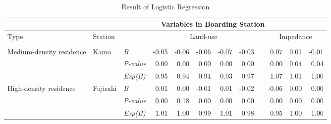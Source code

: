 \begin{sidewaystable}[htbp]
	\centering
	\caption{Result of Logistic Regression}
	\label{tab:chp5:Result}
	\footnotesize %
	\renewcommand{\arraystretch}{1.25} %
	
	\begin{tabular}{p{7em}p{5em}p{5em}<{\centering}rrrrrrrrr}
		\Xhline{1.5pt}
		
		\multicolumn{2}{c}{Destination Station} & & \multicolumn{9}{c}{Variables in Boarding Station} \\
		\midrule
		
		\multirow{2}[5]{7em}{Type} & \multirow{2}[5]{5em}{Station} & \multirow{2}[5]{5em}{\centering{Statistical index}} & \multicolumn{5}{c}{Land-use} & & \multicolumn{3}{c}{Impedance} \\
		\cmidrule{4-8} \cmidrule{10-12}
		
		& & & 
		\multicolumn{1}{p{5em}}{\centering{Commerce}} & 
		\multicolumn{1}{p{5em}}{\centering{Office}} & 
		\multicolumn{1}{p{5em}}{\centering{Residence}} & 
		\multicolumn{1}{p{5em}}{\centering{Education}} & 
		\multicolumn{1}{p{5em}}{\centering{Land-use Aggregation}} & &  \multicolumn{1}{p{5em}}{\centering{Distance}} & 
		\multicolumn{1}{p{5em}}{\centering{Bus Capacity}} & 
		\multicolumn{1}{p{5em}}{\centering{Bus Accessibility}} \\
		\midrule
		
		\multirow{3}[0]{7em}{Medium-density residence} & \multirow{3}[0]{5em}{Kamo} & \textsl{B} & -0.05 & -0.06 & -0.06 & -0.07 & -0.03 & & 0.07 & 0.01 & -0.01 \\
		& & \textsl{P-value} & 0.00 & 0.00 & 0.00 & 0.00 & 0.00 & & 0.00 & 0.04 & 0.04 \\
		& & \textsl{Exp(B)} & 0.95 & 0.94 & 0.94 & 0.93 & 0.97 & & 1.07 & 1.01 & 1.00 \\
		\midrule
		
		\multirow{3}[0]{7em}{High-density residence} & \multirow{3}[0]{5em}{Fujisaki} & \textsl{B} & 0.01 & \cellcolor[rgb]{.8, .8, .8} 0.00 & -0.01 & 0.01 & -0.02 & & -0.06 & 0.00 & 0.00 \\
		& & \textsl{P-value} & 0.00 & \cellcolor[rgb]{.8, .8, .8} 0.18 & 0.00 & 0.00 & 0.00 & & 0.00 & 0.00 & 0.00 \\
		& & \textsl{Exp(B)} & 1.01 & \cellcolor[rgb]{.8, .8, .8} 1.00 & 0.99 & 1.01 & 0.98 & & 0.95 & 1.00 & 1.00 \\
		\midrule
		

\end{tabular}
\end{sidewaystable}
